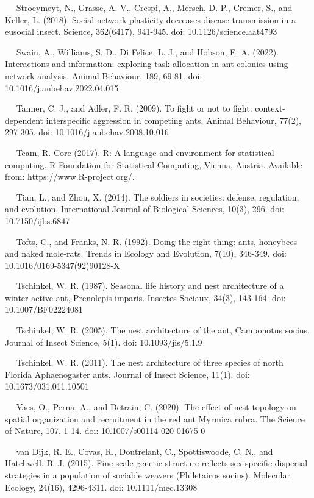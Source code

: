 \documentclass[3p]{elsarticle} %
\begin{document}
~~ Stroeymeyt, N., Grasse, A. V., Crespi, A., Mersch, D. P., Cremer, S.,
and Keller, L. (2018). Social network plasticity decreases disease
transmission in a eusocial insect. Science, 362(6417), 941-945. doi:
10.1126/science.aat4793

~~ Swain, A., Williams, S. D., Di Felice, L. J., and Hobson, E. A.
(2022). Interactions and information: exploring task allocation in ant
colonies using network analysis. Animal Behaviour, 189, 69-81. doi:
10.1016/j.anbehav.2022.04.015

~~ Tanner, C. J., and Adler, F. R. (2009). To fight or not to fight:
context-dependent interspecific aggression in competing ants. Animal
Behaviour, 77(2), 297-305. doi: 10.1016/j.anbehav.2008.10.016

~~ Team, R. Core (2017). R: A language and environment for statistical
computing. R Foundation for Statistical Computing, Vienna, Austria.
Available from: https://www.R-project.org/.

~~ Tian, L., and Zhou, X. (2014). The soldiers in societies: defense,
regulation, and evolution. International Journal of Biological Sciences,
10(3), 296. doi: 10.7150/ijbs.6847

~~ Tofts, C., and Franks, N. R. (1992). Doing the right thing: ants,
honeybees and naked mole-rats. Trends in Ecology and Evolution, 7(10),
346-349. doi: 10.1016/0169-5347(92)90128-X

~~ Tschinkel, W. R. (1987). Seasonal life history and nest architecture
of a winter-active ant, Prenolepis imparis. Insectes Sociaux, 34(3),
143-164. doi: 10.1007/BF02224081

~~ Tschinkel, W. R. (2005). The nest architecture of the ant, Camponotus
socius. Journal of Insect Science, 5(1). doi: 10.1093/jis/5.1.9

~~ Tschinkel, W. R. (2011). The nest architecture of three species of
north Florida Aphaenogaster ants. Journal of Insect Science, 11(1). doi:
10.1673/031.011.10501

~~ Vaes, O., Perna, A., and Detrain, C. (2020). The effect of nest
topology on spatial organization and recruitment in the red ant Myrmica
rubra. The Science of Nature, 107, 1-14. doi: 10.1007/s00114-020-01675-0

~~ van Dijk, R. E., Covas, R., Doutrelant, C., Spottiswoode, C. N., and
Hatchwell, B. J. (2015). Fine-scale genetic structure reflects
sex-specific dispersal strategies in a population of sociable weavers
(Philetairus socius). Molecular Ecology, 24(16), 4296-4311. doi:
10.1111/mec.13308
\end{document}
